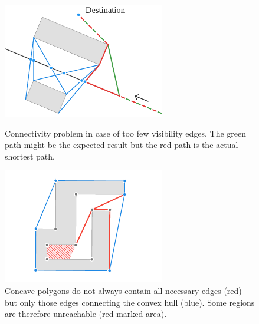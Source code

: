 		\begin{figure}
			\vspace{-1.5\baselineskip}
			\includegraphics[width=\linewidth]{images/qgis-future-work-connectivity-problem}
			\caption{Connectivity problem in case of too few visibility edges. The green path might be the expected result but the red path is the actual shortest path.}
			\label{fig:connectivity-problem}
			\vspace{\baselineskip}
			\includegraphics[width=\linewidth]{images/qgis-future-work-convex-hull-problem}
			\caption{Concave polygons do not always contain all necessary edges (red) but only those edges connecting the convex hull (blue). Some regions are therefore unreachable (red marked area).}
			\label{fig:convex-hull-problem}
		\end{figure}
		
